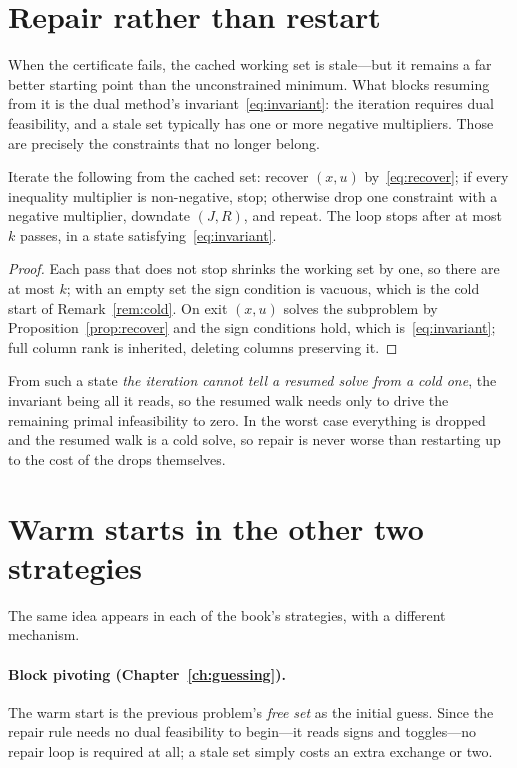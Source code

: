 \section{Repair rather than restart}

When the certificate fails, the cached working set is stale---but it remains a far
better starting point than the unconstrained minimum. What blocks resuming from it is
the dual method's invariant~\eqref{eq:invariant}: the iteration requires dual
feasibility, and a stale set typically has one or more negative multipliers. Those are
precisely the constraints that no longer belong.

\begin{proposition}
\label{prop:repair}
Iterate the following from the cached set: recover $(x,u)$ by~\eqref{eq:recover}; if
every inequality multiplier is non-negative, stop; otherwise drop one constraint with a
negative multiplier, downdate $(J,R)$, and repeat. The loop stops after at most $k$
passes, in a state satisfying~\eqref{eq:invariant}.
\end{proposition}

\begin{proof}
Each pass that does not stop shrinks the working set by one, so there are at most $k$;
with an empty set the sign condition is vacuous, which is the cold start of
Remark~\ref{rem:cold}. On exit $(x,u)$ solves the subproblem by
Proposition~\ref{prop:recover} and the sign conditions hold, which
is~\eqref{eq:invariant}; full column rank is inherited, deleting columns preserving it.
\end{proof}

From such a state \emph{the iteration cannot tell a resumed solve from a cold one}, the
invariant being all it reads, so the resumed walk needs only to drive the remaining
primal infeasibility to zero. In the worst case everything is dropped and the resumed
walk is a cold solve, so repair is never worse than restarting up to the cost of the
drops themselves.

\section{Warm starts in the other two strategies}

The same idea appears in each of the book's strategies, with a different mechanism.

\paragraph{Block pivoting (Chapter~\ref{ch:guessing}).} The warm start is the previous
problem's \emph{free set} as the initial guess. Since the repair rule needs no dual
feasibility to begin---it reads signs and toggles---no repair loop is required at all;
a stale set simply costs an extra exchange or two.

